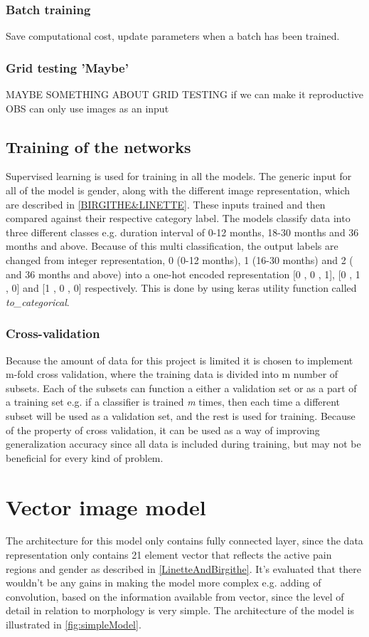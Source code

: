 \subsubsection{Batch training}
Save computational cost, update parameters when a batch has been trained. 
 
\subsubsection{Grid testing 'Maybe'}
MAYBE SOMETHING ABOUT GRID TESTING if we can make it reproductive
OBS can only use images as an input

 
 
\subsection{Training of the networks}
Supervised learning is used for training in all the models. The generic input for all of the model is gender, along with the different image representation, which are described in \autoref{BIRGITHE&LINETTE}. These inputs trained and then compared against their respective category label.   
The models classify data into three different classes e.g. duration interval of 0-12 months, 18-30 months and 36 months and above. Because of this multi classification, the output labels are changed from integer representation, 0 (0-12 months), 1 (16-30 months) and 2 ( and 36 months and above) into a one-hot encoded representation [0 , 0 , 1], [0 , 1 , 0] and [1 , 0 , 0] respectively. This is done by using keras utility function called \textit{to_categorical}. 

\subsubsection{Cross-validation}
Because the amount of data for this project is limited it is chosen to implement m-fold cross validation, where the training data is divided into m number of subsets. Each of the subsets can function a either a validation set or as a part of a training set e.g. if a classifier is trained \textit{m} times, then each time a different subset will be used as a validation set, and the rest is used for training. \citep{Duda2000}
Because of the property of cross validation, it can be used as a way of improving generalization accuracy since all data is included during training, but may not be beneficial for every kind of problem. \citep{Duda2000}

\section{Vector image model}
The architecture for this model only contains fully connected layer, since the data representation only contains 21 element vector that reflects the active pain regions and gender as described in \autoref{LinetteAndBirgithe}. It's evaluated that there wouldn't be any gains in making the model more complex e.g. adding of convolution, based on the information available from vector, since the level of detail in relation to morphology is very simple. 
The architecture of the model is illustrated in \autoref{fig:simpleModel}. 

